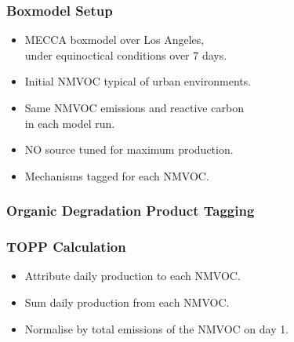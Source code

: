 \begin{frame}
    \frametitle{Boxmodel Setup}

    \vspace{-0.5cm}
    \begin{itemize}
        \item MECCA boxmodel over Los Angeles,\\ under equinoctical conditions over 7 days. \vspace{3mm}
        \item Initial NMVOC typical of urban environments. \vspace{3mm}
        \item Same NMVOC emissions and reactive carbon \\in each model run. \vspace{3mm}
        \item NO source tuned for maximum  production. \vspace{3mm}
        \item Mechanisms tagged for each NMVOC.
    \end{itemize}
\end{frame}

\begin{frame}
    \frametitle{Organic Degradation Product Tagging}
    \vspace{-1.0cm}
    \begin{center}
        
    \end{center}
\end{frame}

{
    \begin{frame}[plain]
    \end{frame}
}

\begin{frame}
    \frametitle{TOPP Calculation}

    \begin{itemize}
        \item Attribute daily  production to each NMVOC. \vspace{5mm}
        \item Sum daily  production from each NMVOC. \vspace{5mm}
        \item Normalise by total emissions of the NMVOC on day 1. \vspace{5mm}
    \end{itemize}
\end{frame}

